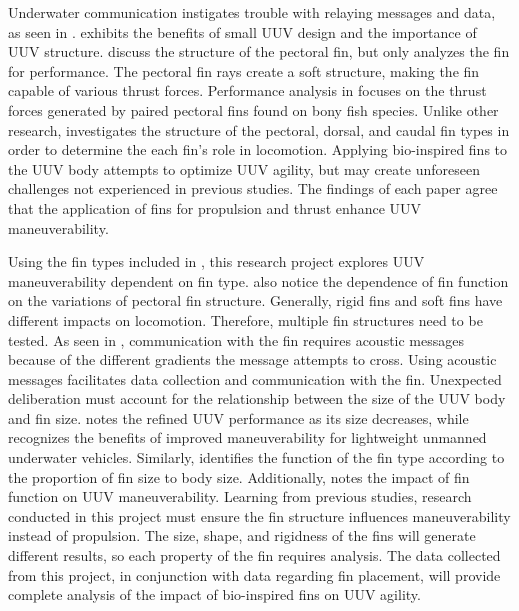 \documentclass[]{IEEEtran}
\begin{document}
Underwater communication instigates trouble with relaying messages and data, as seen in \cite{hiller2012expanding, xu2007initial}.  \cite{hiller2012expanding} exhibits the benefits of small UUV design and the importance of UUV structure.  \cite{geder2013maneuvering, tangorra2006biorobotic, westneat2004structure, lauder2004morphology} discuss the structure of the pectoral fin, but only \cite{westneat2004structure} analyzes the fin for performance.  The pectoral fin rays create a soft structure, making the fin capable of various thrust forces.  Performance analysis in \cite{westneat2004structure} focuses on the thrust forces generated by paired pectoral fins found on bony fish species.  Unlike other research, \cite{lauder2004morphology} investigates the structure of the pectoral, dorsal, and caudal fin types in order to determine the each fin’s role in locomotion.  Applying bio-inspired fins to the UUV body attempts to optimize UUV agility, but may create unforeseen challenges not experienced in previous studies.  The findings of each paper agree that the application of fins for propulsion and thrust enhance UUV maneuverability.  

Using the fin types included in \cite{lauder2004morphology}, this research project explores UUV maneuverability dependent on fin type.  \cite{westneat2004structure, lauder2004morphology} also notice the dependence of fin function on the variations of pectoral fin structure.  Generally, rigid fins and soft fins have different impacts on locomotion.  Therefore, multiple fin structures need to be tested.  As seen in \cite{xu2007initial}, communication with the fin requires acoustic messages because of the different gradients the message attempts to cross.  Using acoustic messages facilitates data collection and communication with the fin.  Unexpected deliberation must account for the relationship between the size of the UUV body and fin size.  \cite{hiller2012expanding} notes the refined UUV performance as its size decreases, while \cite{xu2007initial} recognizes the benefits of improved maneuverability for lightweight unmanned underwater vehicles.  Similarly, \cite{lauder2004morphology} identifies the function of the fin type according to the proportion of fin size to body size.  Additionally, \cite{lauder2004morphology} notes the impact of fin function on UUV maneuverability.  Learning from previous studies, research conducted in this project must ensure the fin structure influences maneuverability instead of propulsion.  The size, shape, and rigidness of the fins will generate different results, so each property of the fin requires analysis.  The data collected from this project, in conjunction with data regarding fin placement, will provide complete analysis of the impact of bio-inspired fins on UUV agility.     
\end{document}

